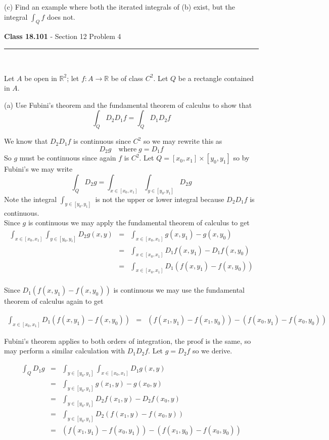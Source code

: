 \documentclass[11pt,reqno]{article}
\begin{document}
\noindent (c) Find an example where both the iterated integrals of (b) exist, but the integral $\int_Q f$ does not.

\begin{flushleft} 
\textbf{Class 18.101} - Section 12 Problem 4\\
\rule{500pt}{1pt}\\
\end{flushleft} 

\noindent Let $A$ be open in $\mathbb{R}^2$; let $f : A \to \mathbb{R}$ be of class $C^2$. Let $Q$ be a rectangle contained in $A$.

\noindent (a) Use Fubini's theorem and the fundamental theorem of calculus to show that
\[ \int_Q D_2 D_1 f = \int_Q D_1 D_2 f \]

We know that $D_2 D_1 f$ is continuous since $C^2$ so we may rewrite this as 
\[ D_2 g \quad \text{where} \; g = D_1 f \]
So $g$ must be continuous since again $f$ is $C^2$.
Let $Q = [x_0,x_1] \times [y_0,y_1]$ so by Fubini's we may write 
\[ \int_Q D_2 g = \int_{x \in [x_0,x_1]} \int_{y \in [y_0,y_1]} D_2 g \]
Note the integral $ \int_{y \in [y_0,y_1]} $ is not the upper or lower integral because $D_2 D_1 f$ is continuous.\\
Since $g$ is continuous we may apply the fundamental theorem of calculus to get
\begin{eqnarray*} 
\int_{x \in [x_0,x_1]} \int_{y \in [y_0,y_1]} D_2 g(x,y) &=&  \int_{x \in [x_0,x_1]} g(x,y_1) - g(x,y_0) \\
&=& \int_{x \in [x_0,x_1]} D_1 f(x,y_1) - D_1 f(x,y_0)\\
&=& \int_{x \in [x_0,x_1]} D_1(f(x,y_1) - f(x,y_0)) \\
\end{eqnarray*}

Since $D_1(f(x,y_1) - f(x,y_0))$ is continuous we may use the fundamental theorem of calculus again to get

\begin{eqnarray*}  
\int_{x \in [x_0,x_1]} D_1(f(x,y_1) - f(x,y_0)) &=& (f(x_1,y_1) - f(x_1,y_0)) - (f(x_0,y_1) - f(x_0,y_0))
\end{eqnarray*}

Fubini's theorem applies to both orders of integration, the proof is the same, so may perform a similar calculation with $D_1 D_2 f$. Let $g = D_2 f$ so we derive.
 
\begin{eqnarray*}
\int_Q D_1 g &=& \int_{y \in [y_0,y_1]} \int_{x \in [x_0,x_1]} D_1 g(x,y) \\
&=&  \int_{y \in [y_0,y_1]} g(x_1,y) - g(x_0,y) \\
&=&  \int_{y \in [y_0,y_1]} D_2 f(x_1,y) - D_2 f(x_0,y) \\
&=&  \int_{y \in [y_0,y_1]} D_2 (f(x_1,y) - f(x_0,y)) \\
&=& (f(x_1,y_1)-f(x_0,y_1)) - (f(x_1,y_0) - f(x_0,y_0))
\end{eqnarray*}
\end{document}
